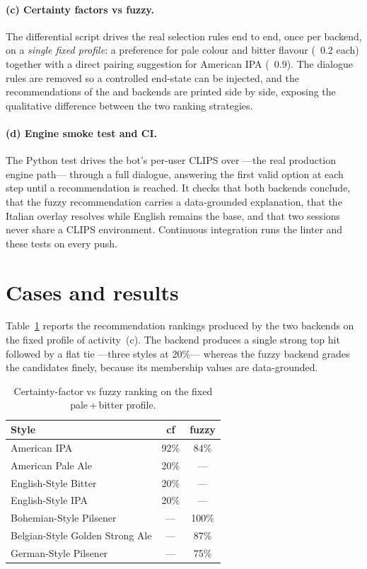 \paragraph{(c) Certainty factors vs fuzzy.}
The differential script  drives the real
selection rules end to end, once per backend, on a \emph{single fixed profile}:
a preference for pale colour and bitter flavour (\cf{}~$0.2$ each) together with
a direct pairing suggestion for American IPA (\cf{}~$0.9$). The dialogue rules
are removed so a controlled end-state can be injected, and the recommendations
of the  and  backends are printed side by side, exposing
the qualitative difference between the two ranking strategies.

\paragraph{(d) Engine smoke test and CI.}
The Python test  drives the bot's per-user CLIPS
 over  ---the real production engine path--- through
a full dialogue, answering the first valid option at each step until a
recommendation is reached. It checks that both backends conclude, that the fuzzy
recommendation carries a data-grounded explanation, that the Italian overlay
resolves while English remains the base, and that two sessions never share a
CLIPS environment. Continuous integration runs the linter and these tests on
every push.

\section{Cases and results}

Table~\ref{tab:cf-vs-fuzzy} reports the recommendation rankings produced by the
two backends on the fixed profile of activity~(c). The \cf{} backend produces a
single strong top hit followed by a flat tie ---three styles at $20\%$--- whereas
the fuzzy backend grades the candidates finely, because its membership values are
data-grounded.

\begin{table}[h]
\centering
\caption{Certainty-factor vs fuzzy ranking on the fixed pale\,+\,bitter profile.}
\label{tab:cf-vs-fuzzy}
\small
\begin{tabular}{@{}lcc@{}}
\toprule
\textbf{Style} & \textbf{cf} & \textbf{fuzzy} \\
\midrule
American IPA                     & 92\% & 84\% \\
American Pale Ale                & 20\% & --- \\
English-Style Bitter            & 20\% & --- \\
English-Style IPA               & 20\% & --- \\
Bohemian-Style Pilsener         & ---  & 100\% \\
Belgian-Style Golden Strong Ale & ---  & 87\% \\
German-Style Pilsener           & ---  & 75\% \\
\bottomrule
\end{tabular}
\end{table}

